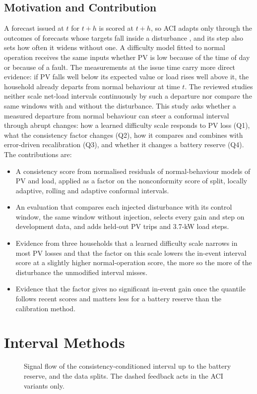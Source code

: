 \documentclass[conference,a4paper]{IEEEtran}
\begin{document}
\subsection{Motivation and Contribution}
A forecast issued at $t$ for $t+h$ is scored at $t+h$, so ACI adapts only through the outcomes of forecasts
whose targets fall inside a disturbance \cite{gibbs}, and its step also sets how often it widens without one. A
difficulty model fitted to normal operation receives the same inputs whether PV is low because of the time of day
or because of a fault. The measurements at the issue time carry more direct evidence: if PV falls well below its
expected value or load rises well above it, the household already departs from normal behaviour at time $t$. The
reviewed studies neither scale net-load intervals continuously by such a departure nor compare the same windows
with and without the disturbance. This study asks whether a measured departure from normal behaviour can steer a
conformal interval through abrupt changes: how a learned difficulty scale responds to PV loss (Q1), what the
consistency factor changes (Q2), how it compares and combines with error-driven recalibration (Q3), and whether it
changes a battery reserve (Q4). The contributions
are:
\begin{itemize}
\item A consistency score from normalised residuals of normal-behaviour models of PV and load, applied as a factor
on the nonconformity score of split, locally adaptive, rolling and adaptive conformal intervals.
\item An evaluation that compares each injected disturbance with its control window, the same window without
injection, selects every gain and step on development data, and adds held-out PV trips and 3.7-kW load steps.
\item Evidence from three households that a learned difficulty scale narrows in most PV losses and that the
factor on this scale lowers the in-event interval score at a slightly higher normal-operation score, the more so
the more of the disturbance the unmodified interval misses.
\item Evidence that the factor gives no significant in-event gain once the quantile follows recent scores and matters
less for a battery reserve than the calibration method.
\end{itemize}


\section{Interval Methods}\label{sec:method}
\begin{figure}[t]
\centering

\caption{Signal flow of the consistency-conditioned interval up to the battery reserve, and the data splits. The
dashed feedback acts in the ACI variants only.}
\label{fig:method}
\end{figure}
\end{document}
